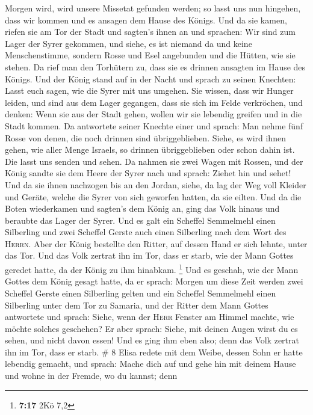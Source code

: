 Morgen wird, wird unsere Missetat gefunden werden; so lasst uns nun
hingehen, dass wir kommen und es ansagen dem Hause des Königs.
 Und da sie kamen, riefen sie am Tor der Stadt und
sagten's ihnen an und sprachen: Wir sind zum Lager der Syrer gekommen,
und siehe, es ist niemand da und keine Menschenstimme, sondern Rosse und
Esel angebunden und die Hütten, wie sie stehen.  Da rief
man den Torhütern zu, dass sie es drinnen ansagten im Hause des Königs.
 Und der König stand auf in der Nacht und sprach zu
seinen Knechten: Lasst euch sagen, wie die Syrer mit uns umgehen. Sie
wissen, dass wir Hunger leiden, und sind aus dem Lager gegangen, dass
sie sich im Felde verkröchen, und denken: Wenn sie aus der Stadt gehen,
wollen wir sie lebendig greifen und in die Stadt kommen. 
Da antwortete seiner Knechte einer und sprach: Man nehme fünf Rosse von
denen, die noch drinnen sind übriggeblieben. Siehe, es wird ihnen gehen,
wie aller Menge Israels, so drinnen übriggeblieben oder schon dahin ist.
Die lasst uns senden und sehen.  Da nahmen sie zwei Wagen
mit Rossen, und der König sandte sie dem Heere der Syrer nach und
sprach: Ziehet hin und sehet!  Und da sie ihnen nachzogen
bis an den Jordan, siehe, da lag der Weg voll Kleider und Geräte, welche
die Syrer von sich geworfen hatten, da sie eilten. Und da die Boten
wiederkamen und sagten's dem König an,  ging das Volk
hinaus und beraubte das Lager der Syrer. Und es galt ein Scheffel
Semmelmehl einen Silberling und zwei Scheffel Gerste auch einen
Silberling nach dem Wort des \textsc{Herrn}.  Aber der
König bestellte den Ritter, auf dessen Hand er sich lehnte, unter das
Tor. Und das Volk zertrat ihn im Tor, dass er starb, wie der Mann Gottes
geredet hatte, da der König zu ihm hinabkam. \footnote{\textbf{7:17} 2Kö
  7,2}  Und es geschah, wie der Mann Gottes dem König
gesagt hatte, da er sprach: Morgen um diese Zeit werden zwei Scheffel
Gerste einen Silberling gelten und ein Scheffel Semmelmehl einen
Silberling unter dem Tor zu Samaria,  und der Ritter dem
Mann Gottes antwortete und sprach: Siehe, wenn der \textsc{Herr} Fenster
am Himmel machte, wie möchte solches geschehen? Er aber sprach: Siehe,
mit deinen Augen wirst du es sehen, und nicht davon essen!
 Und es ging ihm eben also; denn das Volk zertrat ihn im
Tor, dass er starb. \# 8  Elisa redete mit dem Weibe,
dessen Sohn er hatte lebendig gemacht, und sprach: Mache dich auf und
gehe hin mit deinem Hause und wohne in der Fremde, wo du kannst; denn
